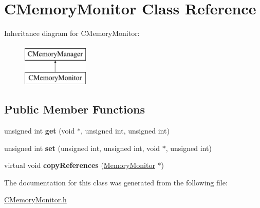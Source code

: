 \hypertarget{classCMemoryMonitor}{\section{\-C\-Memory\-Monitor \-Class \-Reference}
\label{classCMemoryMonitor}
}
\-Inheritance diagram for \-C\-Memory\-Monitor\-:\begin{figure}[H]
\begin{center}
\leavevmode
\includegraphics[height=2.000000cm]{classCMemoryMonitor}
\end{center}
\end{figure}
\subsection*{\-Public \-Member \-Functions}
\begin{DoxyCompactItemize}
\item 
\hypertarget{classCMemoryMonitor_aa2ed1c23479f9ff731ca84de428929d4}{unsigned int {\bfseries get} (void $\ast$, unsigned int, unsigned int)}\label{classCMemoryMonitor_aa2ed1c23479f9ff731ca84de428929d4}

\item 
\hypertarget{classCMemoryMonitor_a2adfa5754befba52a599f497365d6d59}{unsigned int {\bfseries set} (unsigned int, unsigned int, void $\ast$, unsigned int)}\label{classCMemoryMonitor_a2adfa5754befba52a599f497365d6d59}

\item 
\hypertarget{classCMemoryMonitor_acfe9cd2fadf1bcd485d4bf0dbb8f5703}{virtual void {\bfseries copy\-References} (\hyperlink{classMemoryMonitor}{\-Memory\-Monitor} $\ast$)}\label{classCMemoryMonitor_acfe9cd2fadf1bcd485d4bf0dbb8f5703}

\end{DoxyCompactItemize}


\-The documentation for this class was generated from the following file\-:\begin{DoxyCompactItemize}
\item 
\hyperlink{CMemoryMonitor_8h}{\-C\-Memory\-Monitor.\-h}\end{DoxyCompactItemize}
